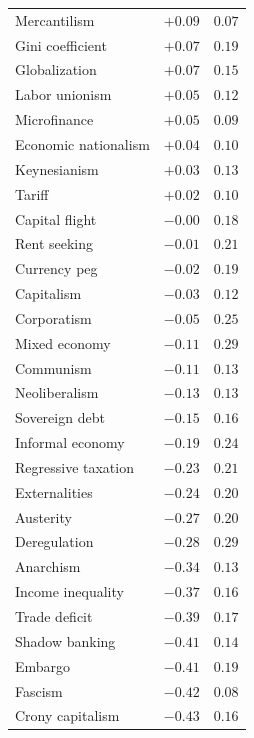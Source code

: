 \documentclass[11pt, letterpaper]{article}
\begin{document}
\begin{longtable}{lcc}
  Mercantilism & $+0.09$ & $0.07$ \\
  Gini coefficient & $+0.07$ & $0.19$ \\
  Globalization & $+0.07$ & $0.15$ \\
  Labor unionism & $+0.05$ & $0.12$ \\
  Microfinance & $+0.05$ & $0.09$ \\
  Economic nationalism & $+0.04$ & $0.10$ \\
  Keynesianism & $+0.03$ & $0.13$ \\
  Tariff & $+0.02$ & $0.10$ \\
  Capital flight & $-0.00$ & $0.18$ \\
  Rent seeking & $-0.01$ & $0.21$ \\
  Currency peg & $-0.02$ & $0.19$ \\
  Capitalism & $-0.03$ & $0.12$ \\
  Corporatism & $-0.05$ & $0.25$ \\
  Mixed economy & $-0.11$ & $0.29$ \\
  Communism & $-0.11$ & $0.13$ \\
  Neoliberalism & $-0.13$ & $0.13$ \\
  Sovereign debt & $-0.15$ & $0.16$ \\
  Informal economy & $-0.19$ & $0.24$ \\
  Regressive taxation & $-0.23$ & $0.21$ \\
  Externalities & $-0.24$ & $0.20$ \\
  Austerity & $-0.27$ & $0.20$ \\
  Deregulation & $-0.28$ & $0.29$ \\
  Anarchism & $-0.34$ & $0.13$ \\
  Income inequality & $-0.37$ & $0.16$ \\
  Trade deficit & $-0.39$ & $0.17$ \\
  Shadow banking & $-0.41$ & $0.14$ \\
  Embargo & $-0.41$ & $0.19$ \\
  Fascism & $-0.42$ & $0.08$ \\
  Crony capitalism & $-0.43$ & $0.16$ \\
\end{longtable}
\end{document}
